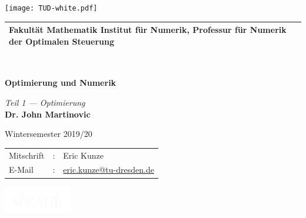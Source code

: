 \documentclass[ngerman, a4paper, 11pt]{report}
\theoremstyle{plain}
\theoremstyle{plain}
\theoremstyle{plain}
\theoremstyle{nonumberplain}
\theoremstyle{nonumberplain}
\theoremstyle{nonumberplain}
\theoremstyle{nonumberplain}
\theoremstyle{proofstyle}
\begin{document}
	\begin{titlepage}
		\pagecolor{cddarkblue!90}%
		\color{white}%

		\raggedright%
		\fosfamily%
		\setlength{\parindent}{0pt}%


		\hspace{-18.6mm}
		\texttt{[image: TUD-white.pdf]}%
		\vspace{3mm}
		\begin{tabular}{m{\textwidth}}
			\hline
			\hspace{-4pt}\small{\textbf{Fakultät Mathematik} Institut für Numerik, Professur für Numerik der Optimalen Steuerung} \\
			\hline
		\end{tabular} \\

		\vspace{5cm}
		{\Huge\bfseries \MakeUppercase Optimierung und Numerik \par}
		\vspace{0.5cm}%
		{\Large \itshape Teil 1 --- Optimierung} \\%

		\vspace{1.5cm}
		\textbf{{\Large Dr. John Martinovic}} \par
		\vspace{0.5cm}
		{\large Wintersemester 2019/20}



		\vfill
		\begin{minipage}{\dimexpr0.75\linewidth-\fboxrule-\fboxsep}
			\begin{tabular}{lll}
				Mitschrift  & : & Eric Kunze \\
				E-Mail      & : & \href{mailto:eric.kunze@tu-dresden.de}{eric.kunze@tu-dresden.de} \\
			\end{tabular}
		\end{minipage}
		\begin{minipage}{\dimexpr0.25\linewidth-\fboxrule-\fboxsep}
			\flushright
			\href{https://github.com/oakoneric/skript-optimierung1}{%
				\includegraphics[width=8em]{img/GitHub-Logo-White.png}%
			}
		\end{minipage}
	\end{titlepage}
	\nopagecolor
\end{document}
